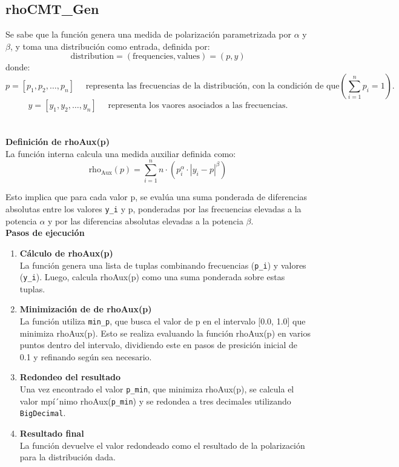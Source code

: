 \documentclass{article}
\begin{document}
    \subsection{rhoCMT\_Gen}
	
	Se sabe que la función genera una medida de polarización parametrizada por $\alpha$ y $\beta$, y toma una distribución como entrada, definida por:  
	\[
	\text{distribution} = (\text{frequencies}, \text{values}) = (p, y)
	\]  
	donde: 
	\[
	p = [p_1, p_2, \dots, p_n] \quad \text{ representa las frecuencias de la distribución, con la condición de que}  \left(\sum_{i=1}^n p_i = 1\right).
	\]  
	\[
	y = [y_1, y_2, \dots, y_n] \quad \text{ representa los vaores asociados a las frecuencias.}
	\]  
	\\\\
	\textbf{Definición de rhoAux(p)}\\

	La función interna calcula una medida auxiliar definida como:
	\[
	\text{rho}_{\text{Aux}}(p) = \sum_{i=1}^n n \cdot (p_i^\alpha \cdot |y_i - p|^\beta)
	\]  
	
	Esto implica que para cada valor p, se evalúa una suma ponderada de diferencias absolutas entre los valores \texttt{y\_i} y p, ponderadas por las frecuencias elevadas a la potencia $\alpha$ y por las diferencias absolutas elevadas a la potencia $\beta$.
	\\
	
	\textbf{Pasos de ejecución }\\
	
	\begin{enumerate}
		\item \textbf{Cálculo de rhoAux(p)}\\
		La función genera una lista de tuplas combinando frecuencias (\texttt{p\_i}) y valores (\texttt{y\_i}). Luego, calcula rhoAux(p) como una suma ponderada sobre estas tuplas.
		\item \textbf{Minimización de  de rhoAux(p)}\\
		La función utiliza \texttt{min\_p}, que busca el valor de p en el intervalo [0.0, 1.0] que minimiza rhoAux(p). Esto se realiza evaluando la función rhoAux(p) en varios puntos dentro del intervalo, dividiendo este en pasos de presición inicial de 0.1 y refinando según sea necesario.
		\item \textbf{Redondeo del resultado}\\
		Una vez encontrado el valor \texttt{p\_min}, que minimiza rhoAux(p), se calcula el valor mpí´nimo rhoAux(\texttt{p\_min}) y se redondea a tres decimales utilizando \texttt{BigDecimal}.
		\item \textbf{Resultado final}\\
		La función devuelve el valor redondeado como el resultado de la polarización para la distribución dada.
	\end{enumerate}
\end{document}
